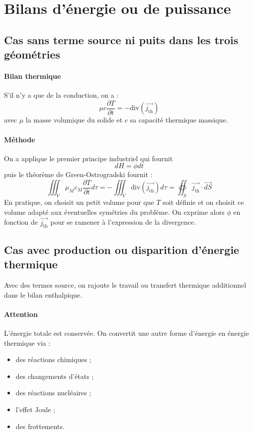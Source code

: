 \documentclass[french]{book}
\theoremstyle{plain}
\theoremstyle{definition}
\theoremstyle{remark}
\renewcommand{\div}{\text{div}}
\begin{document}
\section{Bilans d'énergie ou de puissance}

\subsection{Cas sans terme source ni puits dans les trois géométries}
\paragraph{Bilan thermique} S'il n'y a que de la conduction, on a : $$\mu c\frac{\partial T}{\partial t}=-\div\left(\overrightarrow{j_\text{th}}\right)$$ avec $\mu$ la masse volumique du solide et $c$ sa capacité thermique massique.
\paragraph{Méthode} On a applique le premier principe industriel qui fournit $$dH=\phi dt$$ puis le théorème de Green-Ostrogradski fournit : $$\iiint_V\mu_Mc_M\frac{\partial T}{\partial t}d\tau=-\iiint_V\div\left(\overrightarrow{j_\text{th}}\right)d\tau=\oiint_S\overrightarrow{j_\text{th}}\cdot \overrightarrow{dS}$$ En pratique, on choisit un petit volume pour que $T$ soit définie et on choisit ce volume adapté aux éventuelles symétries du problème. On exprime alors $\phi$ en fonction de $\overrightarrow{j_\text{th}}$ pour se ramener à l'expression de la divergence.
\subsection{Cas avec production ou disparition d'énergie thermique}
Avec des termes source, on rajoute le travail ou transfert thermique additionnel dans le bilan enthalpique. \paragraph{Attention} L'énergie totale est conservée. On convertit une autre forme d'énergie en énergie thermique via : 
\begin{itemize}
	\item des réactions chimiques ;
	\item des changements d'états ;
	\item des réactions nucléaires ;
	\item l'effet Joule ; 
	\item des frottements.	
\end{itemize}
\end{document}
